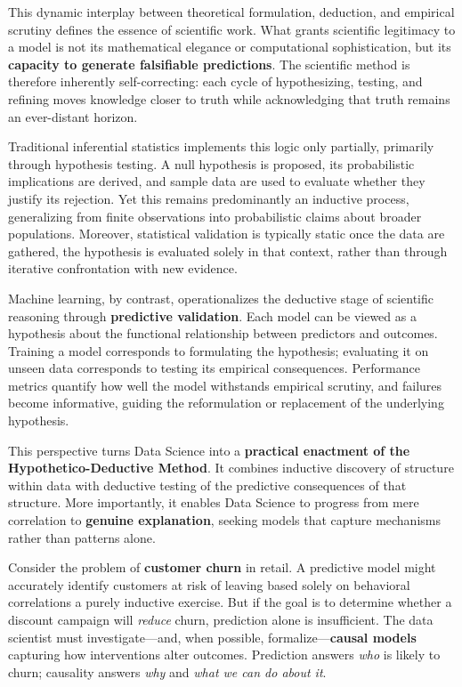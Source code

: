 \documentclass[
  12pt,
  letterpaper,
]{book}
\begin{document}
This dynamic interplay between theoretical formulation, deduction, and
empirical scrutiny defines the essence of scientific work. What grants
scientific legitimacy to a model is not its mathematical elegance or
computational sophistication, but its \textbf{capacity to generate
falsifiable predictions}. The scientific method is therefore inherently
self-correcting: each cycle of hypothesizing, testing, and refining
moves knowledge closer to truth while acknowledging that truth remains
an ever-distant horizon.

Traditional inferential statistics implements this logic only partially,
primarily through hypothesis testing. A null hypothesis is proposed, its
probabilistic implications are derived, and sample data are used to
evaluate whether they justify its rejection. Yet this remains
predominantly an inductive process, generalizing from finite
observations into probabilistic claims about broader populations.
Moreover, statistical validation is typically static once the data are
gathered, the hypothesis is evaluated solely in that context, rather
than through iterative confrontation with new evidence.

Machine learning, by contrast, operationalizes the deductive stage of
scientific reasoning through \textbf{predictive validation}. Each model
can be viewed as a hypothesis about the functional relationship between
predictors and outcomes. Training a model corresponds to formulating the
hypothesis; evaluating it on unseen data corresponds to testing its
empirical consequences. Performance metrics quantify how well the model
withstands empirical scrutiny, and failures become informative, guiding
the reformulation or replacement of the underlying hypothesis.

This perspective turns Data Science into a \textbf{practical enactment
of the Hypothetico-Deductive Method}. It combines inductive discovery of
structure within data with deductive testing of the predictive
consequences of that structure. More importantly, it enables Data
Science to progress from mere correlation to \textbf{genuine
explanation}, seeking models that capture mechanisms rather than
patterns alone.

Consider the problem of \textbf{customer churn} in retail. A predictive
model might accurately identify customers at risk of leaving based
solely on behavioral correlations a purely inductive exercise. But if
the goal is to determine whether a discount campaign will \emph{reduce}
churn, prediction alone is insufficient. The data scientist must
investigate---and, when possible, formalize---\textbf{causal models}
capturing how interventions alter outcomes. Prediction answers
\emph{who} is likely to churn; causality answers \emph{why} and
\emph{what we can do about it}.
\end{document}
